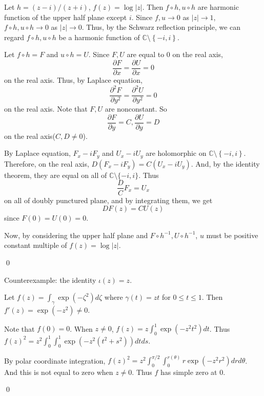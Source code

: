\begin{problem}[9]\hfill

	Let $h = (z-i)/(z+i)$, $f(z) = \log|z|$.
	Then $f \circ h, u\circ h$ are harmonic function of the upper half plane except $i$.
	Since $f, u \rightarrow 0$ as $ |z| \rightarrow 1$, $f \circ h, u\circ h \rightarrow 0$ as $|z| \rightarrow 0$.
	Thus, by the Schwarz reflection principle, we can regard $f\circ h, u\circ h$ be a harmonic function of $\mathbb{C}\setminus \left\{ -i, i \right\}$.

	Let $f \circ h = F$ and $u \circ h = U$.
	Since $F, U$ are equal to $0$ on the real axis,
	\[
		\frac{\partial F}{\partial x} = \frac{\partial U}{\partial x} = 0
	\]
	on the real axis.
	Thus, by Laplace equation, 
	\[
		\frac{\partial^2 F}{\partial y^2} = \frac{\partial^2 U}{\partial y^2} = 0
	\]
	on the real axis.
	Note that $F, U$ are nonconstant.
	So
	\[
		\frac{\partial F}{\partial y} = C, \frac{\partial U}{\partial y} = D
	\]
	on the real axis($C, D \ne 0$).

	By Laplace equation, $F_x -i F_y$ and $U_x-iU_y$ are holomorphic on $\mathbb{C} \setminus \left\{-i, i\right\}$.
	Therefore, on the real axis, $D(F_x - iF_y) = C(U_x -iU_y)$.
	And, by the identity theorem, they are equal on all of $\mathbb{C} \setminus \{ -i, i \}$.
	Thus 
	\[
		\frac{D}{C}F_x = U_x
	\]
	on all of doubly punctured plane, and by integrating them, we get
	\[
		DF(z) = CU(z)
	\]
	since $F(0) = U(0) = 0$.
	
	Now, by considering the upper half plane and $F\circ h^{-1}, U \circ h^{-1}$, $u$ must be positive constant multiple of $f(z) = \log|z|$.

	\qed
\end{problem}

\begin{problem}[10] \hfill

	Counterexample: the identity $\iota(z) = z$.

	Let $f(z) = \int_\gamma \exp(-\zeta^2) d\zeta$ where $\gamma(t) = zt$ for $0\leq t \leq 1$.
	Then $f'(z) = \exp(-z^2) \ne 0$.
	
	Note that $f(0) = 0$.
	When $z \ne 0$, $f(z) = z\int_0^1 \exp(-z^2 t^2) dt$.
	Thus $f(z)^2 = z^2 \int_0^1 \int_0^1 \exp(-z^2(t^2+s^2)) dtds$.

	By polar coordinate integration, $f(z)^2 = z^2\int_0^{\pi/2}\int_0^{r(\theta)} r\exp(-z^2 r^2) dr d\theta$.
	And this is not equal to zero when $z \ne 0$.
	Thus $f$ has simple zero at $0$.
	
	\qed
\end{problem}
